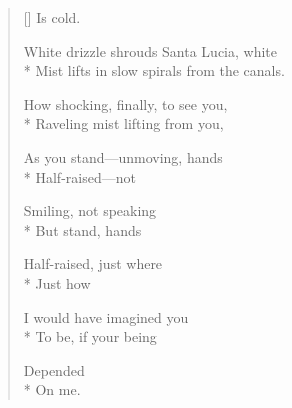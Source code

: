 \label{ch:venice_venezia}
\settowidth{\versewidth}{Mist lifts in slow spirals from the canals.}
\begin{verse}[\versewidth]
\hspace*{3\vgap} Is cold.

White drizzle shrouds Santa Lucia, white\\*
Mist lifts in slow spirals from the canals.

How shocking, finally, to see you,\\*
Raveling mist lifting from you,

As you stand---unmoving, hands\\*
Half-raised---not

Smiling, not speaking\\*
But stand, hands

Half-raised, just where\\*
Just how

I would have imagined you\\*
To be, if your being

Depended\\*
On me.
\end{verse}
